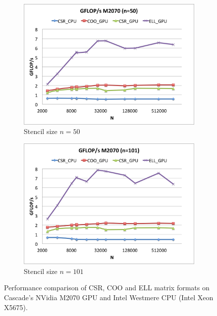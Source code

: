 \documentclass{report}
\begin{document}
\begin{figure}
\begin{subfigure}[t]{0.48\textwidth}
\includegraphics[width=\textwidth]{gpu_content/cascade_spmv/gflops_cascade_m2070_n50.png}
\caption{Stencil size $n=50$}
\label{fig:gflops_cascade_m2070_n50}
\end{subfigure}
\quad
\begin{subfigure}[t]{0.48\textwidth}
\centering
\includegraphics[width=\textwidth]{gpu_content/cascade_spmv/gflops_cascade_m2070_n101.png}
\caption{Stencil size $n=101$}
\label{fig:gflops_cascade_m2070_n101}
\end{subfigure}
\caption{Performance comparison of CSR, COO and ELL matrix formats on Cascade's NVidia M2070 GPU and Intel Westmere CPU (Intel Xeon X5675).}
\end{figure}
\end{document}
